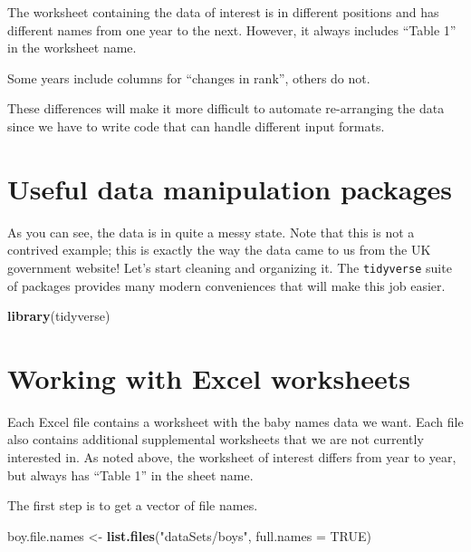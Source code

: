 \documentclass[]{book}
\newenvironment{Shaded}{\begin{snugshade}}{\end{snugshade}}
\newcommand{\KeywordTok}[1]{\textcolor[rgb]{0.13,0.29,0.53}{\textbf{#1}}}
\newcommand{\DataTypeTok}[1]{\textcolor[rgb]{0.13,0.29,0.53}{#1}}
\newcommand{\StringTok}[1]{\textcolor[rgb]{0.31,0.60,0.02}{#1}}
\newcommand{\OtherTok}[1]{\textcolor[rgb]{0.56,0.35,0.01}{#1}}
\newcommand{\NormalTok}[1]{#1}
\begin{document}
The worksheet containing the data of interest is in different positions
and has different names from one year to the next. However, it always
includes ``Table 1'' in the worksheet name.

Some years include columns for ``changes in rank'', others do not.

These differences will make it more difficult to automate re-arranging
the data since we have to write code that can handle different input
formats.

\section{Useful data manipulation
packages}\label{useful-data-manipulation-packages}

As you can see, the data is in quite a messy state. Note that this is
not a contrived example; this is exactly the way the data came to us
from the UK government website! Let's start cleaning and organizing it.
The \texttt{tidyverse} suite of packages provides many modern
conveniences that will make this job easier.

\begin{Shaded}
\begin{Highlighting}[]
\KeywordTok{library}\NormalTok{(tidyverse)}
\end{Highlighting}
\end{Shaded}

\section{Working with Excel
worksheets}\label{working-with-excel-worksheets}

Each Excel file contains a worksheet with the baby names data we want.
Each file also contains additional supplemental worksheets that we are
not currently interested in. As noted above, the worksheet of interest
differs from year to year, but always has ``Table 1'' in the sheet name.

The first step is to get a vector of file names.

\begin{Shaded}
\begin{Highlighting}[]
\NormalTok{boy.file.names <-}\StringTok{ }\KeywordTok{list.files}\NormalTok{(}\StringTok{"dataSets/boys"}\NormalTok{, }\DataTypeTok{full.names =} \OtherTok{TRUE}\NormalTok{)}
\end{Highlighting}
\end{Shaded}
\end{document}
